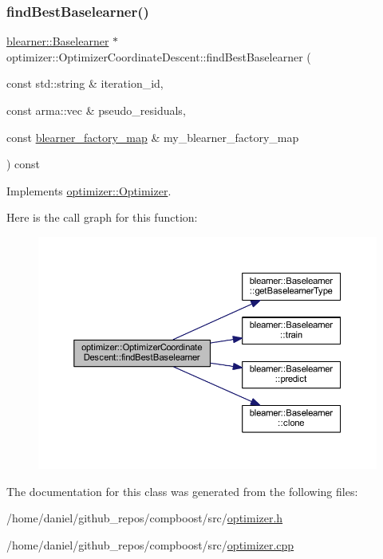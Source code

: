 \subsubsection{\texorpdfstring{find\+Best\+Baselearner()}{findBestBaselearner()}}
{\footnotesize\ttfamily \hyperlink{classblearner_1_1_baselearner}{blearner\+::\+Baselearner} $\ast$ optimizer\+::\+Optimizer\+Coordinate\+Descent\+::find\+Best\+Baselearner (\begin{DoxyParamCaption}\item[{const std\+::string \&}]{iteration\+\_\+id,  }\item[{const arma\+::vec \&}]{pseudo\+\_\+residuals,  }\item[{const \hyperlink{baselearner__factory__list_8h_a058570e00ae11b882cfed36eb40be025}{blearner\+\_\+factory\+\_\+map} \&}]{my\+\_\+blearner\+\_\+factory\+\_\+map }\end{DoxyParamCaption}) const\hspace{0.3cm}{\ttfamily [virtual]}}



Implements \hyperlink{classoptimizer_1_1_optimizer_a134c7b34ed868231fbab53e9ebfa8fd8}{optimizer\+::\+Optimizer}.

Here is the call graph for this function\+:\nopagebreak
\begin{figure}[H]
\begin{center}
\leavevmode
\includegraphics[width=350pt]{classoptimizer_1_1_optimizer_coordinate_descent_af657f2f5f702bddab8c640368704d18c_cgraph}
\end{center}
\end{figure}


The documentation for this class was generated from the following files\+:\begin{DoxyCompactItemize}
\item 
/home/daniel/github\+\_\+repos/compboost/src/\hyperlink{optimizer_8h}{optimizer.\+h}\item 
/home/daniel/github\+\_\+repos/compboost/src/\hyperlink{optimizer_8cpp}{optimizer.\+cpp}\end{DoxyCompactItemize}
